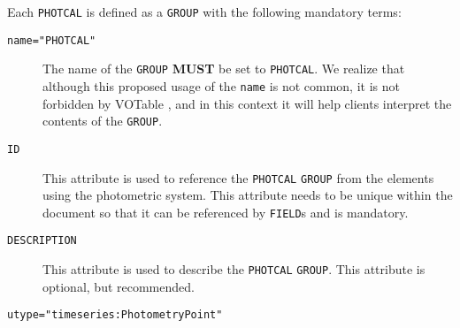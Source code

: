 \documentclass[11pt,a4paper]{ivoa}
\let\fg=\color
\def\attr#1{{\tt{\fg{DarkRed}#1}}}
\def\elem#1{{\tt{\fg{DarkRed}#1}}}
\def\attrval#1#2{{\tt{\fg{DarkRed}#1}="{\fg{DarkPurple}#2}"}}
\begin{document}
Each \elem{PHOTCAL} is defined as a \elem{GROUP} with the following mandatory terms:
\begin{description}
     \item[\attrval{name}{PHOTCAL}] The name of the \elem{GROUP} \textbf{MUST} be set to \verb|PHOTCAL|. We realize that although this proposed usage of the \attr{name} is not common, it is not forbidden by VOTable \cite[][see Section 3.2]{std:VOTABLE1.4}, and in this context it will help clients interpret the contents of the \elem{GROUP}. 
     \item[\attr{ID}] This attribute is used to reference the \elem{PHOTCAL} \elem{GROUP} from the elements using the photometric system. This attribute needs to be unique within the document so that it can be referenced by \elem{FIELD}s and is mandatory.
     \item[\attr{DESCRIPTION}] This attribute is used to describe the \elem{PHOTCAL} \elem{GROUP}. This attribute is optional, but recommended.
     \item[\attrval{utype}{timeseries:PhotometryPoint}]
\end{description}
\end{document}
